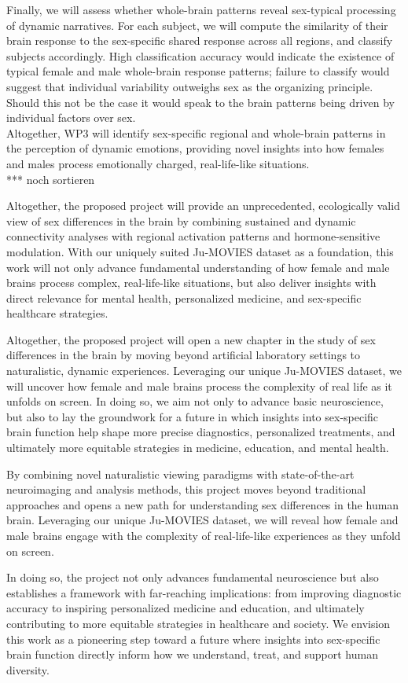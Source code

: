 \documentclass[11pt,a4paper]{article}
\begin{document}
Finally, we will assess whether whole-brain patterns reveal sex-typical processing of dynamic narratives. 
For each subject, we will compute the similarity of their brain response to the sex-specific shared response 
across all regions, and classify subjects accordingly. High classification accuracy would indicate 
the existence of typical female and male whole-brain response patterns; failure to classify would 
suggest that individual variability outweighs sex as the organizing principle. Should this not be the 
case it would speak to the brain patterns being driven by individual factors
over sex.\\

Altogether, WP3 will identify sex-specific regional and whole-brain patterns in the perception of 
dynamic emotions, providing novel insights into how females and males process emotionally charged, 
real-life-like situations.\\  

*** noch sortieren

Altogether, the proposed project will provide an unprecedented, ecologically valid view of sex differences 
in the brain by combining sustained and dynamic connectivity analyses with regional activation patterns 
and hormone-sensitive modulation. With our uniquely suited Ju-MOVIES dataset as a foundation, 
this work will not only advance fundamental understanding of how female and male brains process complex, 
real-life-like situations, but also deliver insights with direct relevance for mental health, 
personalized medicine, and sex-specific healthcare strategies.

Altogether, the proposed project will open a new chapter in the study of sex differences in the brain by moving beyond artificial laboratory settings to naturalistic, dynamic experiences. Leveraging our unique Ju-MOVIES dataset, we will uncover how female and male brains process the complexity of real life as it unfolds on screen. In doing so, we aim not only to advance basic neuroscience, but also to lay the groundwork for a future in which insights into sex-specific brain function help shape more precise diagnostics, personalized treatments, and ultimately more equitable strategies in medicine, education, and mental health.

By combining novel naturalistic viewing paradigms with state-of-the-art neuroimaging and analysis methods, this project moves beyond traditional approaches and opens a new path for understanding sex differences in the human brain. Leveraging our unique Ju-MOVIES dataset, we will reveal how female and male brains engage with the complexity of real-life-like experiences as they unfold on screen.

In doing so, the project not only advances fundamental neuroscience but also establishes a framework with far-reaching implications: from improving diagnostic accuracy to inspiring personalized medicine and education, and ultimately contributing to more equitable strategies in healthcare and society. We envision this work as a pioneering step toward a future where insights into sex-specific brain function directly inform how we understand, treat, and support human diversity.


\printbibliography
\end{document}
